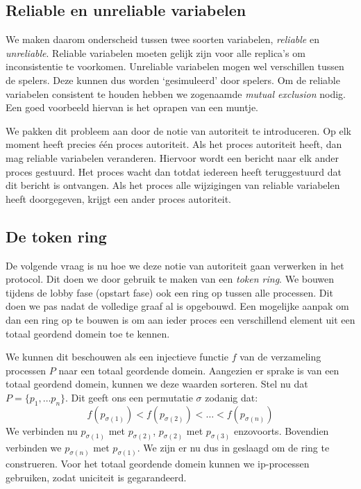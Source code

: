 \documentclass[a4paper,11pt]{article}
\begin{document}
    \subsection{Reliable en unreliable variabelen}
    We maken daarom onderscheid tussen twee soorten variabelen, \emph{reliable} en \emph{unreliable}. Reliable variabelen moeten gelijk zijn voor alle replica's om inconsistentie te voorkomen. Unreliable variabelen mogen wel verschillen tussen de spelers. Deze kunnen dus worden `gesimuleerd' door spelers. Om de reliable variabelen consistent te houden hebben we zogenaamde \emph{mutual exclusion} nodig. Een goed voorbeeld hiervan is het oprapen van een muntje.

    We pakken dit probleem aan door de notie van autoriteit te introduceren. Op elk moment heeft precies \'e\'en proces autoriteit. Als het proces autoriteit heeft, dan mag reliable variabelen veranderen. Hiervoor wordt een bericht naar elk ander proces gestuurd. Het proces wacht dan totdat iedereen heeft teruggestuurd dat dit bericht is ontvangen. Als het proces alle wijzigingen van reliable variabelen heeft doorgegeven, krijgt een ander proces autoriteit.

    \subsection{De token ring}
    De volgende vraag is nu hoe we deze notie van autoriteit gaan verwerken in het protocol. Dit doen we door gebruik te maken van een \emph{token ring}. We bouwen tijdens de lobby fase (opstart fase) ook een ring op tussen alle processen. Dit doen we pas nadat de volledige graaf al is opgebouwd. Een mogelijke aanpak om dan een ring op te bouwen is om aan ieder proces een verschillend element uit een totaal geordend domein toe te kennen.

    We kunnen dit beschouwen als een injectieve functie $f$ van de verzameling processen $P$ naar een totaal geordende domein. Aangezien er sprake is van een totaal geordend domein, kunnen we deze waarden sorteren. Stel nu dat $P = \{ p_1, \ldots p_n\}$. Dit geeft ons een permutatie $\sigma$ zodanig dat:
    \[
    f(p_{\sigma(1)}) < f(p_{\sigma(2)}) < \ldots < f(p_{\sigma(n)})
    \]
    We verbinden nu $p_{\sigma(1)}$ met $p_{\sigma(2)}$, $p_{\sigma(2)}$ met $p_{\sigma(3)}$ enzovoorts. Bovendien verbinden we $p_{\sigma(n)}$ met $p_{\sigma(1)}$. We zijn er nu dus in geslaagd om de ring te construeren. Voor het totaal geordende domein kunnen we ip-processen gebruiken, zodat uniciteit is gegarandeerd.
\end{document}
